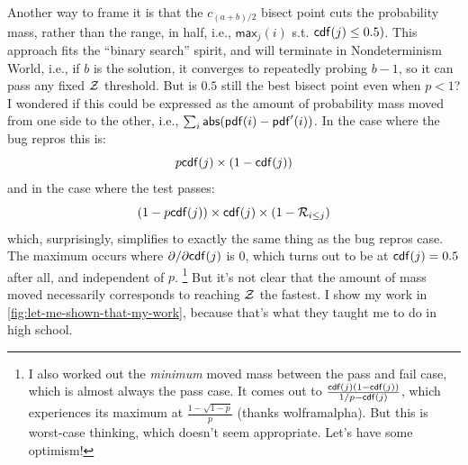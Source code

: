 \documentclass[11pt]{sigplanconf}
\begin{document}
Another way to frame it is that the $c_{(a+b)/2}$ bisect point
cuts the probability mass, rather than the range, in half,
i.e., $\mathsf{max}_j (i)$ s.t. $\mathsf{cdf}(j) \le 0.5)$.
This approach
fits the ``binary search'' spirit,
and will terminate in Nondeterminism World,
i.e.,
if $b$ is the solution, it converges to repeatedly probing $b-1$,
so it can pass any fixed $\mathcal{Z}$ threshold.
%
But is $0.5$ still the best bisect point even when $p<1$?
I wondered if this could be expressed as the amount of probability mass moved from one side to the other,
i.e., $\sum_i \mathsf{abs}(\mathsf{pdf}(i) - \mathsf{pdf}'(i))$.
In the case where the bug repros this is:
\[
	p\mathsf{cdf}(j) \times (1-\mathsf{cdf}(j))
\]
and in the case where the test passes:
\[
	(1-p\mathsf{cdf}(j)) \times \mathsf{cdf}(j) \times (1-\mathcal{R}_{i\le j})
\]
which, surprisingly, simplifies to exactly the same thing as the bug repros case.
The maximum occurs where $\partial/\partial \mathsf{cdf}(j)$ is 0,
which turns out to be at $\mathsf{cdf}(j)=0.5$ after all, and independent of $p$.%
\footnote{I also worked out the {\it minimum} moved mass between the pass and fail case,
which is almost always the pass case.
It comes out to
$\frac{\mathsf{cdf}(j)(1-\mathsf{cdf}(j))}{1/p-\mathsf{cdf}(j)}$,
which experiences its maximum at
$\frac{1-\sqrt{1-p}}{p}$ (thanks wolframalpha).
But this is worst-case thinking, which doesn't seem appropriate.
Let's have some optimism!}
But it's not clear that the amount of mass moved
necessarily corresponds to reaching $\mathcal{Z}$ the fastest.
I show my work in \cref{fig:let-me-shown-that-my-work},
because that's what they taught me to do in high school.
\end{document}
